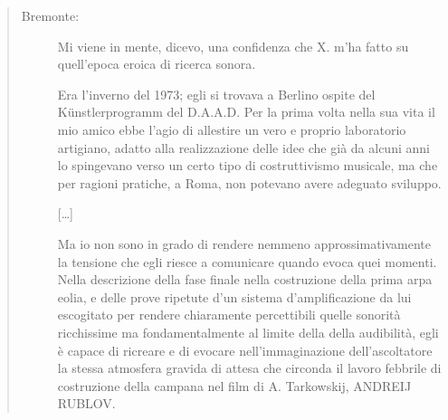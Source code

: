 \begin{quote}
  \begin{sf}
    \small
    \begin{description}
      \item[Bremonte:] Mi viene in mente, dicevo, una confidenza che X. m’ha
      fatto su quell’epoca eroica di ricerca sonora.

      Era l’inverno del 1973; egli si trovava a Berlino ospite del
      Künstlerprogramm del D.A.A.D. Per la prima volta nella sua vita il mio
      amico ebbe l’agio di allestire un vero e proprio laboratorio artigiano,
      adatto alla realizzazione delle idee che già da alcuni anni lo spingevano
      verso un certo tipo di costruttivismo musicale, ma che per ragioni
      pratiche, a Roma, non potevano avere adeguato sviluppo.

      [\ldots]


      Ma io non sono in grado di rendere nemmeno approssimativamente la tensione
      che egli riesce a comunicare quando evoca quei momenti. Nella descrizione
      della fase finale nella costruzione della prima arpa eolia, e delle prove
      ripetute d’un sistema d’amplificazione da lui escogitato per rendere
      chiaramente percettibili quelle sonorità ricchissime ma fondamentalmente
      al limite della della audibilità, egli è capace di ricreare e di evocare
      nell’immaginazione dell’ascoltatore la stessa atmosfera gravida di attesa
      che circonda il lavoro febbrile di costruzione della campana nel film di
      A. Tarkowskij, ANDREIJ RUBLOV.
    \end{description}
  \end{sf}
\end{quote}

